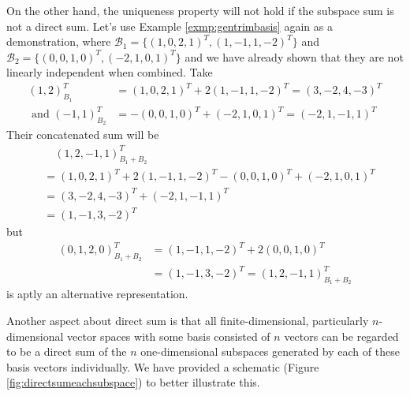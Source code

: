 On the other hand, the uniqueness property will not hold if the subspace sum is not a direct sum. Let's use Example \ref{exmp:gentrimbasis} again as a demonstration, where $\mathcal{B}_1 = \{(1,0,2,1)^T, (1,-1,1,-2)^T\}$ and $\mathcal{B}_2 = \{(0,0,1,0)^T, (-2,1,0,1)^T\}$ and we have already shown that they are not linearly independent when combined. Take
\begin{align*}
(1,2)_{B_1}^T &= (1,0,2,1)^T + 2(1,-1,1,-2)^T = (3,-2,4,-3)^T \\
\text{ and } (-1,1)_{B_2}^T &= -(0,0,1,0)^T + (-2,1,0,1)^T = (-2,1,-1,1)^T
\end{align*} Their concatenated sum will be 
\begin{align*}
&\quad (1,2,-1,1)_{B_1+B_2}^T \\ 
&= (1,0,2,1)^T + 2(1,-1,1,-2)^T - (0,0,1,0)^T + (-2,1,0,1)^T \\
&= (3,-2,4,-3)^T + (-2,1,-1,1)^T \\
&= (1,-1,3,-2)^T  
\end{align*}
but 
\begin{align*}
(0,1,2,0)_{B_1+B_2}^T &= (1,-1,1,-2)^T + 2(0,0,1,0)^T \\
&= (1,-1,3,-2)^T = (1,2,-1,1)_{B_1+B_2}^T 
\end{align*}
is aptly an alternative representation.

Another aspect about direct sum is that all finite-dimensional, particularly $n$-dimensional vector spaces with some basis consisted of $n$ vectors can be regarded to be a direct sum of the $n$ one-dimensional subspaces generated by each of these basis vectors individually. We have provided a schematic (Figure \ref{fig:directsumeachsubspace}) to better illustrate this.

